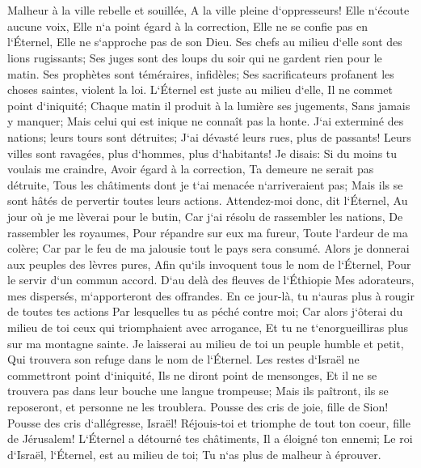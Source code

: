 \chapter{}

\verse Malheur à la ville rebelle et souillée, A la ville pleine d`oppresseurs! 
\verse Elle n`écoute aucune voix, Elle n`a point égard à la correction, Elle ne se confie pas en l`Éternel, Elle ne s`approche pas de son Dieu. 
\verse Ses chefs au milieu d`elle sont des lions rugissants; Ses juges sont des loups du soir qui ne gardent rien pour le matin. 
\verse Ses prophètes sont téméraires, infidèles; Ses sacrificateurs profanent les choses saintes, violent la loi. 
\verse L`Éternel est juste au milieu d`elle, Il ne commet point d`iniquité; Chaque matin il produit à la lumière ses jugements, Sans jamais y manquer; Mais celui qui est inique ne connaît pas la honte. 
\verse J`ai exterminé des nations; leurs tours sont détruites; J`ai dévasté leurs rues, plus de passants! Leurs villes sont ravagées, plus d`hommes, plus d`habitants! 
\verse Je disais: Si du moins tu voulais me craindre, Avoir égard à la correction, Ta demeure ne serait pas détruite, Tous les châtiments dont je t`ai menacée n`arriveraient pas; Mais ils se sont hâtés de pervertir toutes leurs actions. 
\verse Attendez-moi donc, dit l`Éternel, Au jour où je me lèverai pour le butin, Car j`ai résolu de rassembler les nations, De rassembler les royaumes, Pour répandre sur eux ma fureur, Toute l`ardeur de ma colère; Car par le feu de ma jalousie tout le pays sera consumé. 
\verse Alors je donnerai aux peuples des lèvres pures, Afin qu`ils invoquent tous le nom de l`Éternel, Pour le servir d`un commun accord. 
\verse D`au delà des fleuves de l`Éthiopie Mes adorateurs, mes dispersés, m`apporteront des offrandes. 
\verse En ce jour-là, tu n`auras plus à rougir de toutes tes actions Par lesquelles tu as péché contre moi; Car alors j`ôterai du milieu de toi ceux qui triomphaient avec arrogance, Et tu ne t`enorgueilliras plus sur ma montagne sainte. 
\verse Je laisserai au milieu de toi un peuple humble et petit, Qui trouvera son refuge dans le nom de l`Éternel. 
\verse Les restes d`Israël ne commettront point d`iniquité, Ils ne diront point de mensonges, Et il ne se trouvera pas dans leur bouche une langue trompeuse; Mais ils paîtront, ils se reposeront, et personne ne les troublera. 
\verse Pousse des cris de joie, fille de Sion! Pousse des cris d`allégresse, Israël! Réjouis-toi et triomphe de tout ton coeur, fille de Jérusalem! 
\verse L`Éternel a détourné tes châtiments, Il a éloigné ton ennemi; Le roi d`Israël, l`Éternel, est au milieu de toi; Tu n`as plus de malheur à éprouver. 
